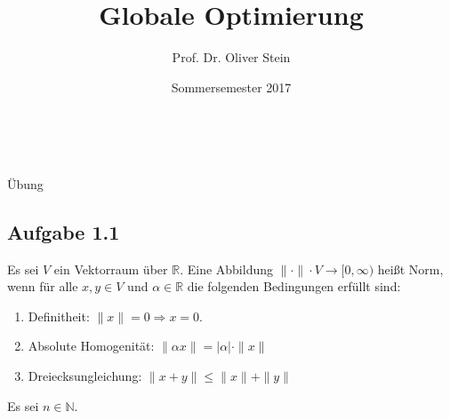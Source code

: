 \documentclass[12pt]{extreport} %
\title{Globale Optimierung}
\author{Prof. Dr. Oliver Stein}
\date{Sommersemester 2017}
\makeatletter
\newcommand{\N}{\mathbb{N}}
\newcommand{\R}{\mathbb{R}}
\theoremstyle{named}
\theoremstyle{nnamed}
\theoremstyle{itshape}
\theoremstyle{normal}
\def\maketitle{ \begin{titlepage} 
			~\vspace{3cm} 
		\begin{center} {\Huge \@title} \end{center} 
		\begin{center} {\LARGE Übung }\end{center}
	 		\vspace*{1cm} 
	 	\begin{center} {\large \@author} \end{center} 
	 	\begin{center} \@date \end{center} 
	 		\vspace*{7cm} 
	 	\begin{center} \@publishers \end{center} 
	 		\vfill 
	\end{titlepage} }
\makeatother
\begin{document}
\begin{titlepage}
	\maketitle
	\thispagestyle{empty}
\end{titlepage}

	
\subsection*{Aufgabe 1.1}
Es sei $V$ ein Vektorraum über $\R$. Eine Abbildung $\| \cdot \| \cdot V \rightarrow [0, \infty)$ heißt Norm, wenn für alle $x, y \in V $ und $\alpha \in \R$ die folgenden Bedingungen erfüllt sind:
\begin{enumerate}[label=\arabic*\upshape)]
	\item Definitheit: $\| x \| = 0 \Rightarrow x = 0$.
	\item Absolute Homogenität: $\| \alpha x \| = |\alpha| \cdot \| x \|$
	\item Dreiecksungleichung: $\| x + y\| \leq \| x \| + \| y \|$
\end{enumerate}
Es sei $n \in \N$.
\end{document}
